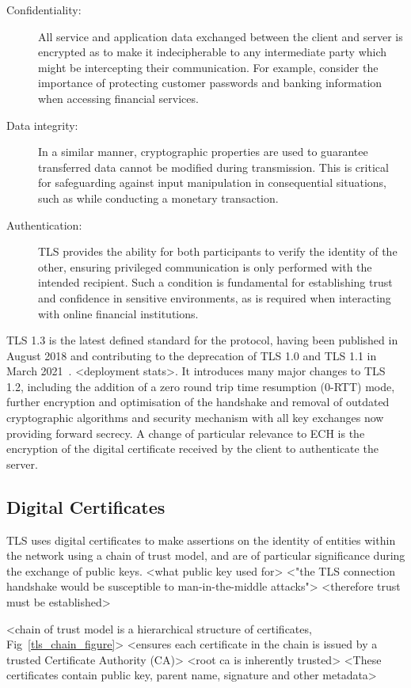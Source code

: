\begin{description}
\item[Confidentiality:] All service and application data exchanged between the client and server is encrypted as to make it indecipherable to any intermediate party which might be intercepting their communication. For example, consider the importance of protecting customer passwords and banking information when accessing financial services.
\item[Data integrity:] In a similar manner, cryptographic properties are used to guarantee transferred data cannot be modified during transmission. This is critical for safeguarding against input manipulation in consequential situations, such as while conducting a monetary transaction.
\item[Authentication:] TLS provides the ability for both participants to verify the identity of the other, ensuring privileged communication is only performed with the intended recipient. Such a condition is fundamental for establishing trust and confidence in sensitive environments, as is required when interacting with online financial institutions.
\end{description}

TLS 1.3 is the latest defined standard for the protocol, having been published in August 2018 and contributing to the deprecation of TLS 1.0 and TLS 1.1 in March 2021~\cite{rfc8446, rfc8996}. <deployment stats>. It introduces many major changes to TLS 1.2, including the addition of a zero round trip time resumption (0-RTT) mode, further encryption and optimisation of the handshake and removal of outdated cryptographic algorithms and security mechanism with all key exchanges now providing forward secrecy. A change of particular relevance to ECH is the encryption of the digital certificate received by the client to authenticate the server.

\subsection{Digital Certificates}

TLS uses digital certificates to make assertions on the identity of entities within the network using a chain of trust model, and are of particular significance during the exchange of public keys. <what public key used for> <"the TLS connection handshake would be susceptible to man-in-the-middle attacks"> <therefore trust must be established>

<chain of trust model is a hierarchical structure of certificates, Fig~\ref{tls_chain_figure}>
<ensures each certificate in the chain is issued by a trusted Certificate Authority (CA)>
<root ca is inherently trusted>
<These certificates contain public key, parent name, signature and other metadata>

